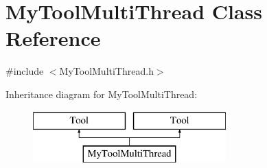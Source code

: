 \hypertarget{classMyToolMultiThread}{\section{My\-Tool\-Multi\-Thread Class Reference}
\label{classMyToolMultiThread}
}


{\ttfamily \#include $<$My\-Tool\-Multi\-Thread.\-h$>$}

Inheritance diagram for My\-Tool\-Multi\-Thread\-:\begin{figure}[H]
\begin{center}
\leavevmode
\includegraphics[height=2.000000cm]{classMyToolMultiThread}
\end{center}
\end{figure}
